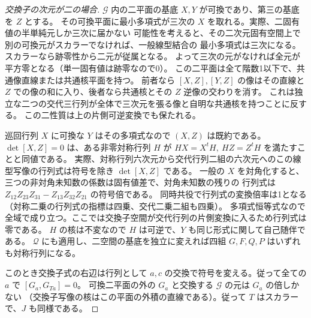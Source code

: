\begin{proof}[交換子の次元が二の場合]
$\mathcal G$ 内の二平面の基底 $X,Y$ が可換であり、第三の基底を $Z$ とする。
その可換平面に最小多項式が三次の $X$ を取れる。実際、二固有値の半単純元しか三次に届かない
可能性を考えると、その二次元固有空間上で別の可換元がスカラーでなければ、一般線型結合の
最小多項式は三次になる。スカラーなら跡零性から二元が従属となる。
よって三次の元がなければ全元が平方零となる（単一固有値は跡零なので0）。
この二平面は全て階数1以下で、共通像直線または共通核平面を持つ。
前者なら $[X,Z],[Y,Z]$ の像はその直線と $Z$ での像の和に入り、後者なら共通核とその $Z$ 逆像の交わりを消す。
これは独立な二つの交代三行列が全体で三次元を張る像と自明な共通核を持つことに反する。
この二性質は上の片側可逆変換でも保たれる。

巡回行列 $X$ に可換な $Y$ はその多項式なので $(X,Z)$ は既約である。
$\det[X,Z]=0$ は、ある非零対称行列 $H$ が $HX=X^tH,\ HZ=Z^tH$ を満たすことと同値である。
実際、対称行列六次元から交代行列二組の六次元へのこの線型写像の行列式は符号を除き $\det[X,Z]$ である。
一般の $X$ を対角化すると、三つの非対角未知数の係数は固有値差で、対角未知数の残りの
行列式は $Z_{12}Z_{23}Z_{31}-Z_{13}Z_{32}Z_{21}$ の符号倍である。
同時共役で行列式の変換倍率は1となる（対称二乗の行列式の指標は四乗、交代二乗二組も四乗）。
多項式恒等式なので全域で成り立つ。ここでは交換子空間が交代行列の片側変換に入るため行列式は零である。
$H$ の核は不変なので $H$ は可逆で、$Y$ も同じ形式に関して自己随伴である。
$\mathcal Q$ にも適用し、二空間の基底を独立に変えれば四組 $G,F,Q,P$ はいずれも対称行列になる。

このとき交換子式の右辺は行列として $a,c$ の交換で符号を変える。従って全ての $a$ で $[G_a,G_{Ta}]=0$。
可換二平面の外の $G_a$ と交換する $\mathcal G$ の元は $G_a$ の倍しかない
（交換子写像の核はこの平面の外積の直線である）。従って $T$ はスカラーで、$J$ も同様である。
\end{proof}

